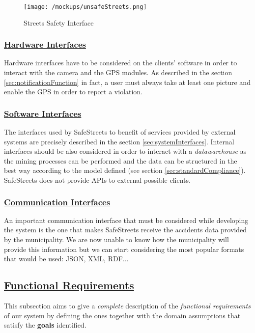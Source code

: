 	 \begin{figure}[h]
	 	\centering
	 	\begin{minipage}{0.7\textwidth}
	 		\centering
	 		\texttt{[image: /mockups/unsafeStreets.png]}
	 		\caption{Streets Safety Interface}
	 	\end{minipage}
	 \end{figure} 
 
	\FloatBarrier
	
	\subsubsection[Hardware Interfaces]{\hyperlink{toc}{Hardware Interfaces}}
		Hardware interfaces have to be considered on the clients' software in order to interact with the camera and the GPS modules. As described in the section \ref{sec:notificationFunction} in fact, a user must always take at least one picture and enable the GPS in order to report a violation. 
		
	\subsubsection[Software Interfaces]{\hyperlink{toc}{Software Interfaces}}
		The interfaces used by SafeStreets to benefit of services provided by external systems are precisely described in the section \ref{sec:systemInterfaces}. Internal interfaces should be also considered in order to interact with a \emph{datawarehouse} as the mining processes can be performed and the data can be structured in the best way according to the model defined (see section \ref{sec:standardCompliance}). SafeStreets does not provide APIs to external possible clients.
		
	\subsubsection[Communication Interfaces]{\hyperlink{toc}{Communication Interfaces}}
		An important communication interface that must be considered while developing the system is the one that makes SafeStreets receive the accidents data provided by the municipality. We are now unable to know how the municipality will provide this information but we can start considering the most popular formats that would be used: JSON, XML, RDF... 

\subsection[Functional Requirements]{\hyperlink{toc}{Functional Requirements}}
	\label{sec:functionalRequirements}
	This subsection aims to give a \emph{complete} description of the \emph{functional requirements} of our system by defining the ones together with the domain assumptions that satisfy the \textbf{goals} identified.
	
